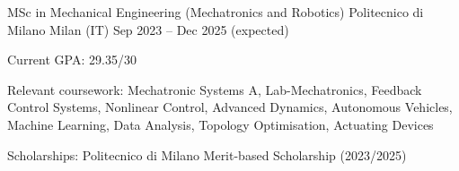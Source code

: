 
\cventry
{MSc in Mechanical Engineering (Mechatronics and Robotics)}
{Politecnico di Milano}
{Milan (IT)}
{Sep 2023 -- Dec 2025 (expected)}
{
    \begin{cvitems}
        \item {Current GPA: 29.35/30}
        \item {Relevant coursework: Mechatronic Systems A, Lab-Mechatronics, Feedback Control Systems, Nonlinear Control, Advanced Dynamics, Autonomous Vehicles, Machine Learning, Data Analysis, Topology Optimisation, Actuating Devices}
        \item {Scholarships: Politecnico di Milano Merit-based Scholarship (2023/2025)}
    \end{cvitems}
}